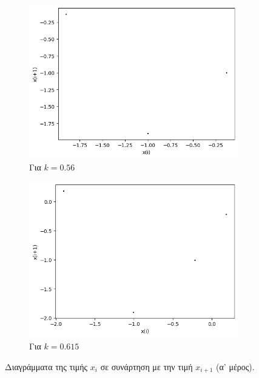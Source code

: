 \begin{figure}[ht]
\begin{subfigure}[b]{0.4\textwidth}
		\includegraphics[width=\textwidth]{LateX images/graphs q19/0.56}
		\caption{Για $k=0.56$}
		\label{f:k96}
	\end{subfigure}
	\hfill
	\begin{subfigure}[b]{0.4\textwidth}
		\centering
		\includegraphics[width=\textwidth]{LateX images/graphs q19/g8}
		\caption{Για $k=0.615$}
		\label{f:k97}
	\end{subfigure}
	\hfill		
	\caption{Διαγράμματα της τιμής \(x_i\) σε συνάρτηση με την τιμή \(x_{i+1}\) (α' μέρος).}
	\label{f:k242}
\end{figure}

